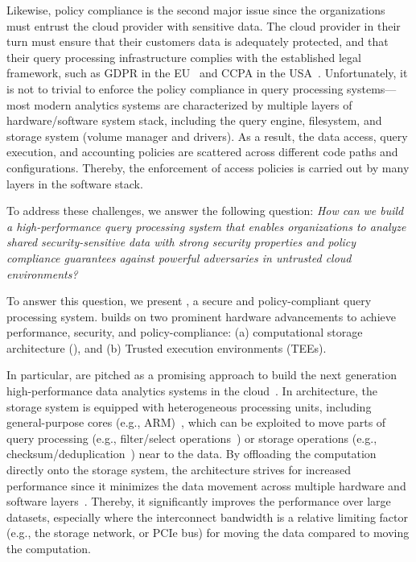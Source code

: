 Likewise, policy compliance is the second major issue since the organizations must entrust the cloud provider with sensitive data. The cloud provider in their turn must ensure that their customers data is adequately protected, and that their query processing infrastructure complies with the established legal framework, such as GDPR in the EU~\cite{gdpr} and CCPA in the USA~\cite{ccpa}. Unfortunately, it is not to trivial to enforce the policy compliance in query processing systems---most modern analytics systems are characterized by multiple layers of hardware/software system stack, including the query engine, filesystem, and storage system (volume manager and drivers). As a result, the data access, query execution, and accounting policies are scattered across different code paths and configurations. Thereby, the enforcement of access policies is carried
out by many layers in the software stack.
 


 
 To address these challenges, we answer the following question: \textit{How can we build a high-performance query processing system that enables organizations to analyze shared security-sensitive data with strong security properties and policy compliance guarantees against powerful adversaries in untrusted cloud environments?}



To answer this question, we present \project, a secure and policy-compliant query processing system. \project builds on two prominent hardware advancements to achieve performance, security, and policy-compliance: (a) computational storage architecture (\csd), and (b) Trusted execution environments (TEEs). 

In particular, \csd are pitched as a promising approach to build the next generation high-performance data analytics systems in the cloud~\cite{arm_storage,NGD}. In \csd architecture, the storage system is equipped with heterogeneous processing units, including general-purpose cores (e.g., ARM)~\cite{gu2016,blockNDP, NGD,huaweiStorage}, which can be exploited to move parts of query processing (e.g., filter/select operations~\cite{gu2016,blockNDP}) or storage operations (e.g., checksum/deduplication~\cite{234725, bhatotia2012}) near to the data. 
By offloading the computation directly onto the storage system, the \csd architecture strives for increased performance since it minimizes the data movement across multiple hardware and software layers~\cite{10.1145/3102980.3102990,blockNDP,do2013, huaweiStorage}. Thereby, it significantly improves the performance over large datasets, especially where the interconnect bandwidth is a relative limiting factor (e.g., the storage network, or PCIe bus) for moving the data compared to moving the computation.



